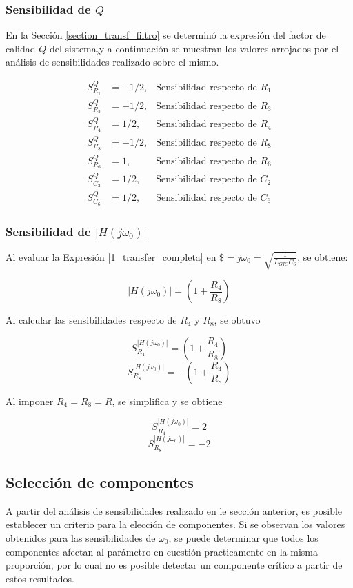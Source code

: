 \subsubsection{Sensibilidad de $Q$}
En la Sección \ref{section_transf_filtro} se determinó la expresión del factor de calidad $Q$ del sistema,y a continuación se muestran los valores arrojados por el análisis de sensibilidades realizado sobre el mismo.

\begin{subequations}
\begin{align*}
  S_{R_1}^{Q} &= -1/2, &\text{Sensibilidad respecto de }R_1 \\
  S_{R_3}^{Q} &= -1/2, &\text{Sensibilidad respecto de }R_3 \\
  S_{R_4}^{Q} &= 1/2, &\text{Sensibilidad respecto de }R_4 \\
  S_{R_8}^{Q} &= -1/2, &\text{Sensibilidad respecto de } R_8 \\
  S_{R_6}^{Q} &= 1, &\text{Sensibilidad respecto de } R_6 \\
  S_{C_2}^{Q} &= 1/2, &\text{Sensibilidad respecto de } C_2 \\
  S_{C_6}^{Q} &= 1/2, &\text{Sensibilidad respecto de } C_6
\end{align*}
\end{subequations}

\subsubsection{Sensibilidad de $|H(j\omega_0)|$}
Al evaluar la Expresión \ref{1_transfer_completa} en $\$ = j\omega_0 = \sqrt{\frac{1}{L_{GIC}C_6}}$, se obtiene:

\[
|H(j\omega_0)| = \left(1 + \frac{R_4}{R_8}\right)
\]

Al calcular las sensibilidades respecto de $R_4$ y $R_8$, se obtuvo

\[
S_{R_4}^{|H(j\omega_0)|} = \left(1 + \frac{R_4}{R_8}\right)
\]
\[
S_{R_8}^{|H(j\omega_0)|} = -\left(1 + \frac{R_4}{R_8}\right)
\]

Al imponer $R_4 = R_8 = R$, se simplifica y se obtiene

\[
S_{R_4}^{|H(j\omega_0)|} = 2
\]
\[
S_{R_8}^{|H(j\omega_0)|} = -2
\]

\subsection{Selección de componentes}
A partir del análisis de sensibilidades realizado en le sección anterior, es posible establecer un criterio para la elección de componentes. Si se observan los valores obtenidos para las sensibilidades de $\omega_0$, se puede determinar que todos los componentes afectan al parámetro en cuestión practicamente en la misma proporción, por lo cual no es posible detectar un componente crítico a partir de estos resultados.

